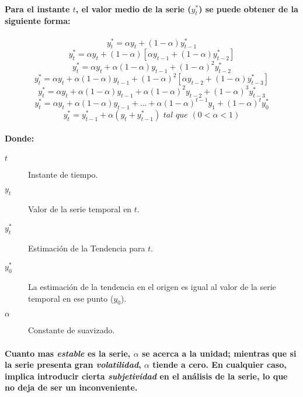 \paragraph{
Para el instante $t$, el valor medio de la serie ($y_t^*$) se puede obtener de la siguiente forma:
}
\begin{equation}
y_t^* = \alpha y_t + (1-\alpha) y_{t-1}^*
\end{equation}
\begin{equation}
y_t^* = \alpha y_t + (1-\alpha) [\alpha y_{t-1} + (1-\alpha) y_{t-2}^*]
\end{equation}
\begin{equation}
y_t^* = \alpha y_t + \alpha(1-\alpha) y_{t-1} + (1-\alpha)^2 y_{t-2}^*
\end{equation}
\begin{equation}
y_t^* = \alpha y_t + \alpha(1-\alpha) y_{t-1} + (1-\alpha)^2 [\alpha y_{t-2} + (1-\alpha) y_{t-3}^*]
\end{equation}
\begin{equation}
y_t^* = \alpha y_t + \alpha(1-\alpha) y_{t-1} + \alpha(1-\alpha)^2 y_{t-2} + (1-\alpha)^3 y_{t-3}^*
\end{equation}
\begin{equation}
y_t^* = \alpha y_t + \alpha(1-\alpha) y_{t-1} +...+\alpha(1-\alpha)^{t-1} y_1 + (1-\alpha)^t y_0^*
\end{equation}
\begin{equation}
y_t^* = y_{t-1}^* + \alpha(y_{t} + y_{t-1}^*) \textit{ tal que } (0 < \alpha < 1)
\end{equation}
\paragraph{
Donde:
}
\begin{description}
\item[$t$] Instante de tiempo.
\item[$y_t$] Valor de la serie temporal en $t$.
\item[$y_t^*$] Estimación de la Tendencia para $t$.
\item[$y_0^*$] La estimación de la tendencia en el origen es igual al valor de la serie temporal en ese punto ($y_0$).
\item[$\alpha$] Constante de suavizado.
\end{description}
\paragraph{
Cuanto mas \emph{estable} es la serie, $\alpha$ se acerca a la unidad; mientras que si la serie presenta gran \emph{volatilidad}, $\alpha$ tiende a cero. En cualquier caso, implica introducir cierta \emph{subjetividad} en el análisis de la serie, lo que no deja de ser un inconveniente.
}

